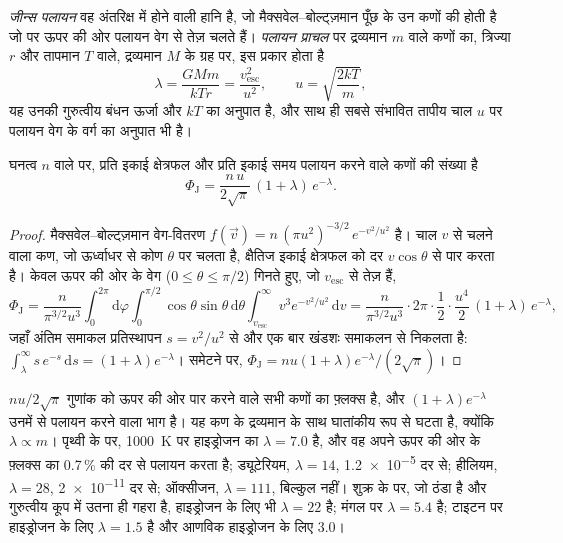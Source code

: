 \begin{definition}[जीन्स पलायन; पलायन प्राचल]\label{def:b3:planetary-atmospheres:jeans-escape}
\emph{जीन्स पलायन} वह अंतरिक्ष में होने वाली हानि है, जो
मैक्सवेल--बोल्ट्ज़मान पूँछ के उन कणों की होती है जो  पर ऊपर की ओर
पलायन वेग से तेज़ चलते हैं। \emph{पलायन
प्राचल}  पर द्रव्यमान $m$ वाले कणों का,
त्रिज्या $r$ और तापमान $T$ वाले, द्रव्यमान $M$ के ग्रह पर, इस प्रकार होता है
\[
\lambda = \frac{GMm}{kTr} = \frac{v_\mathrm{esc}^2}{u^2},
\qquad u = \sqrt{\frac{2kT}m},
\]
यह उनकी गुरुत्वीय बंधन ऊर्जा और $kT$ का अनुपात है, और साथ ही
सबसे संभावित तापीय चाल $u$ पर पलायन वेग के वर्ग का अनुपात भी है।
\end{definition}

\begin{theorem}[जीन्स फ़्लक्स]\label{thm:b3:planetary-atmospheres:jeans}
घनत्व $n$ वाले  पर, प्रति इकाई क्षेत्रफल और प्रति इकाई
समय पलायन करने वाले कणों की संख्या है
\[
\Phi_\mathrm J = \frac{n\,u}{2\sqrt\pi}\,(1 + \lambda)\,e^{-\lambda}.
\]
\end{theorem}

\begin{proof}
मैक्सवेल--बोल्ट्ज़मान वेग-वितरण $f(\vec v) =
n\,(\pi u^2)^{-3/2}\,e^{-v^2/u^2}$ है। चाल $v$ से चलने वाला कण, जो
ऊर्ध्वाधर से कोण $\theta$ पर चलता है, क्षैतिज इकाई क्षेत्रफल को
दर $v\cos\theta$ से पार करता है। केवल ऊपर की ओर के वेग ($0 \le \theta \le
\pi/2$) गिनते हुए, जो $v_\mathrm{esc}$ से तेज़ हैं,
\[
\Phi_\mathrm J = \frac{n}{\pi^{3/2}u^3}\int_0^{2\pi}\!\!\mathrm d\varphi
\int_0^{\pi/2}\!\!\cos\theta\sin\theta\,\mathrm d\theta
\int_{v_\mathrm{esc}}^\infty v^3e^{-v^2/u^2}\,\mathrm dv
= \frac{n}{\pi^{3/2}u^3}\cdot2\pi\cdot\frac12\cdot
\frac{u^4}2\,(1 + \lambda)\,e^{-\lambda},
\]
जहाँ अंतिम समाकल प्रतिस्थापन $s = v^2/u^2$ से और
एक बार खंडशः समाकलन से निकलता है: $\int_\lambda^\infty s\,e^{-s}\,\mathrm ds =
(1 + \lambda)e^{-\lambda}$। समेटने पर, $\Phi_\mathrm J = n u (1 +
\lambda) e^{-\lambda}/(2\sqrt\pi)$।
\end{proof}

$n u/2\sqrt\pi$ गुणांक  को ऊपर की ओर पार करने वाले सभी कणों का
फ़्लक्स है, और $(1 + \lambda)e^{-\lambda}$ उनमें से पलायन करने वाला भाग है।
यह कण के द्रव्यमान के साथ घातांकीय रूप से घटता है, क्योंकि
$\lambda \propto m$। पृथ्वी के  पर, \qty{1000}{K} पर हाइड्रोजन का
$\lambda = 7.0$ है, और वह अपने ऊपर की ओर के फ़्लक्स का 0.7\,\% की दर से पलायन करता है;
ड्यूटेरियम, $\lambda = 14$, \num{1.2e-5} दर से; हीलियम, $\lambda = 28$,
\num{2e-11} दर से; ऑक्सीजन, $\lambda = 111$, बिल्कुल नहीं। शुक्र के  पर,
जो ठंडा है और गुरुत्वीय कूप में उतना ही गहरा है, हाइड्रोजन के लिए भी $\lambda = 22$ है;
मंगल पर $\lambda = 5.4$ है; टाइटन पर हाइड्रोजन के लिए $\lambda = 1.5$ है
और आणविक हाइड्रोजन के लिए 3.0।

